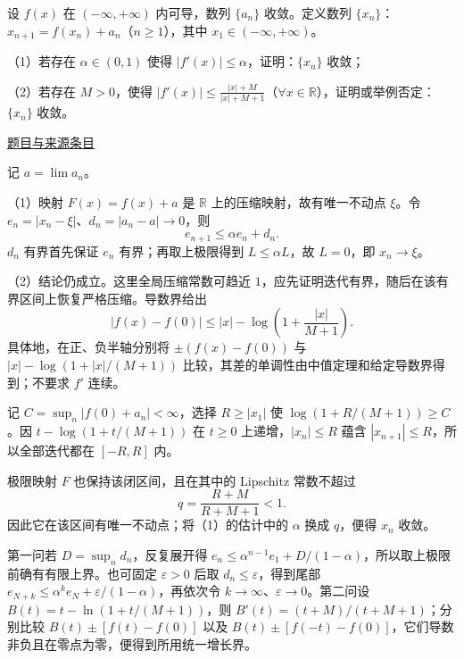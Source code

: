 \documentclass[12pt,fontset=fandol]{ctexart}
\begin{document}
\begin{example}[来源序号7]\label{ex:fin17-high:7}\label{pr:fin17-high:7}

设 $f(x)$ 在 $(-\infty,+\infty)$ 内可导，数列 $\{a_n\}$ 收敛。定义数列 $\{x_n\}$：$x_{n+1}=f(x_n)+a_n$（$n\ge1$），其中 $x_1\in(-\infty,+\infty)$。

（1）若存在 $\alpha\in(0,1)$ 使得 $|f'(x)|\le\alpha$，证明：$\{x_n\}$ 收敛；

（2）若存在 $M>0$，使得 $|f'(x)|\le\frac{|x|+M}{|x|+M+1}$（$\forall x\in\mathbb R$），证明或举例否定：$\{x_n\}$ 收敛。

\par\href{https://github.com/lzxcr/cmc-mathematics/blob/64916fa1fdbc3e444a652eca204d5669058ee321/src/problems/finals/17/07.md}{题目与来源条目}

\end{example}

\begin{solve}\label{ans:fin17-high:7}

记 $a=\lim a_n$。

（1）映射 $F(x)=f(x)+a$ 是 $\mathbb R$ 上的压缩映射，故有唯一不动点 $\xi$。令 $e_n=|x_n-\xi|$、$d_n=|a_n-a|\to0$，则
\[
e_{n+1}\le\alpha e_n+d_n.
\]
$d_n$ 有界首先保证 $e_n$ 有界；再取上极限得到 $L\le\alpha L$，故 $L=0$，即 $x_n\to\xi$。

（2）结论仍成立。这里全局压缩常数可趋近 $1$，应先证明迭代有界，随后在该有界区间上恢复严格压缩。导数界给出
\[
|f(x)-f(0)|\le |x|-\log\left(1+\frac{|x|}{M+1}\right).
\]
具体地，在正、负半轴分别将 $\pm(f(x)-f(0))$ 与 $|x|-\log(1+|x|/(M+1))$ 比较，其差的单调性由中值定理和给定导数界得到；不要求 $f'$ 连续。

记 $C=\sup_n|f(0)+a_n|<\infty$，选择 $R\ge|x_1|$ 使 $\log(1+R/(M+1))\ge C$。因 $t-\log(1+t/(M+1))$ 在 $t\ge0$ 上递增，$|x_n|\le R$ 蕴含 $|x_{n+1}|\le R$，所以全部迭代都在 $[-R,R]$ 内。

极限映射 $F$ 也保持该闭区间，且在其中的 Lipschitz 常数不超过
\[
q=\frac{R+M}{R+M+1}<1.
\]
因此它在该区间有唯一不动点；将（1）的估计中的 $\alpha$ 换成 $q$，便得 $x_n$ 收敛。

第一问若 $D=\sup_nd_n$，反复展开得 $e_n\le\alpha^{n-1}e_1+D/(1-\alpha)$，所以取上极限前确有有限上界。也可固定 $\varepsilon>0$ 后取 $d_n\le\varepsilon$，得到尾部 $e_{N+k}\le\alpha^ke_N+\varepsilon/(1-\alpha)$，再依次令 $k\to\infty$、$\varepsilon\to0$。第二问设 $B(t)=t-\ln(1+t/(M+1))$，则 $B'(t)=(t+M)/(t+M+1)$；分别比较 $B(t)\pm[f(t)-f(0)]$ 以及 $B(t)\pm[f(-t)-f(0)]$，它们导数非负且在零点为零，便得到所用统一增长界。

\end{solve}
\end{document}
